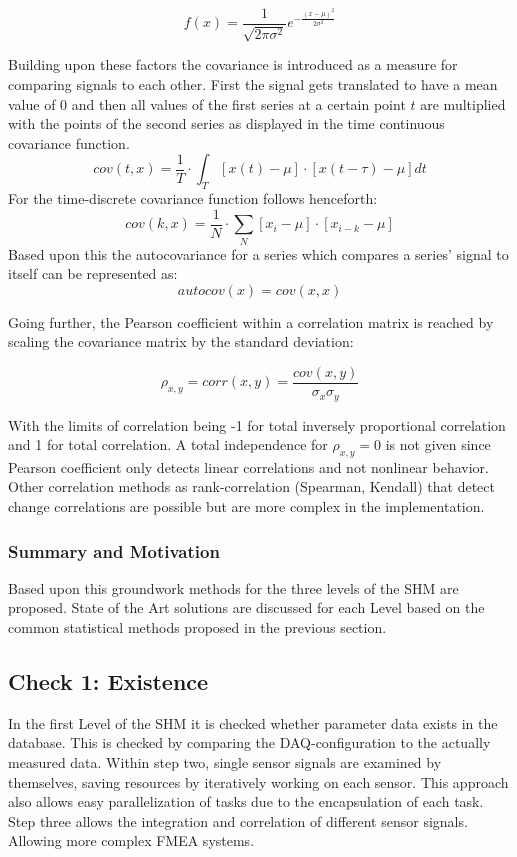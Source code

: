 \begin{equation}
    f(x)=\frac{1}{\sqrt{2 \pi \sigma^2}} e^{-\frac{(x-\mu)^2}{2 \sigma^2}}
    \label{eq:pmf}
\end{equation}

Building upon these factors the covariance is introduced as a measure for comparing signals to each other. First the signal gets translated to have a mean value of 0 and then all values of the first series at a certain point $t$ are multiplied with the points of the second series as displayed in the time continuous covariance function.
$$
cov(t, x)=\frac{1}{T} \cdot \int_T[x(t)-\mu] \cdot[x(t-\tau)-\mu] d t
$$
For the time-discrete covariance function follows henceforth:
$$
cov(k, x)=\frac{1}{N} \cdot \sum_N\left[x_i-\mu\right] \cdot\left[x_{i-k}-\mu\right]
$$
Based upon this the autocovariance for a series which compares a series' signal to itself can be represented as:
$$autocov(x) = cov(x,x)$$

Going further, the Pearson coefficient within a correlation matrix is reached by scaling the covariance matrix by the standard deviation: \cite{smith_scientist_1999}

$$\rho_{x,y} = corr(x,y)=\frac{cov(x,y)}{\sigma_x \sigma_y}$$

With the limits of correlation being -1 for total inversely proportional correlation and 1 for total correlation. A total independence for $\rho_{x,y}=0$ is not given since Pearson coefficient only detects linear correlations and not nonlinear behavior. Other correlation methods as rank-correlation (Spearman, Kendall) that detect change correlations are possible but are more complex in the implementation.

\subsubsection{Summary and Motivation}

Based upon this groundwork methods for the three levels of the SHM are proposed. State of the Art solutions are discussed for each Level based on the common statistical methods proposed in the previous section.

\subsection{Check 1: Existence}
In the first Level of the SHM it is checked whether parameter data exists in the database. This is checked by comparing the DAQ-configuration to the actually measured data. Within step two, single sensor signals are examined by themselves, saving resources by iteratively working on each sensor. This approach also allows easy parallelization of tasks due to the encapsulation of each task. Step three allows the integration and correlation of different sensor signals. Allowing more complex FMEA systems.

